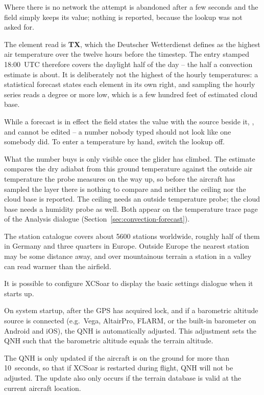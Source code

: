 Where there is no network the attempt is abandoned after a few seconds
and the field simply keeps its value; nothing is reported, because the
lookup was not asked for.

The element read is \textbf{TX}, which the Deutscher Wetterdienst
defines as the highest air temperature over the twelve hours before
the timestep.  The entry stamped 18:00~UTC therefore covers the
daylight half of the day -- the half a convection estimate is about.
It is deliberately not the highest of the hourly temperatures: a
statistical forecast states each element in its own right, and
sampling the hourly series reads a degree or more low, which is a few
hundred feet of estimated cloud base.

While a forecast is in effect the field states the value with the
source beside it, , and cannot
be edited -- a number nobody typed should not look like one somebody
did.  To enter a temperature by hand, switch the lookup off.

\tip{} What the number buys is only visible once the glider has
climbed.  The estimate compares the dry adiabat from this ground
temperature against the outside air temperature the probe measures on
the way up, so before the aircraft has sampled the layer there is
nothing to compare and neither the ceiling nor the cloud base is
reported.  The ceiling needs an outside temperature probe; the cloud
base needs a humidity probe as well.  Both appear on the temperature
trace page of the Analysis dialogue
(Section~\ref{sec:convection-forecast}).

\tip{} The station catalogue covers about 5600 stations worldwide,
roughly half of them in Germany and three quarters in Europe.  Outside
Europe the nearest station may be some distance away, and over
mountainous terrain a station in a valley can read warmer than the
airfield.

\tip{} It is possible to configure XCSoar to display the basic
settings dialogue when it starts up.

On system startup, after the GPS has acquired lock, and if a
barometric altitude source is connected (e.g.\ Vega, AltairPro,
FLARM, or the built-in barometer on Android and iOS), the QNH is
automatically adjusted.  This adjustment sets the
QNH such that the barometric altitude equals the terrain altitude.

The QNH is only updated if the aircraft is on the ground for more than
10~seconds, so that if XCSoar is restarted during flight, QNH will not
be adjusted.  The update also only occurs if the terrain database is
valid at the current aircraft location.


